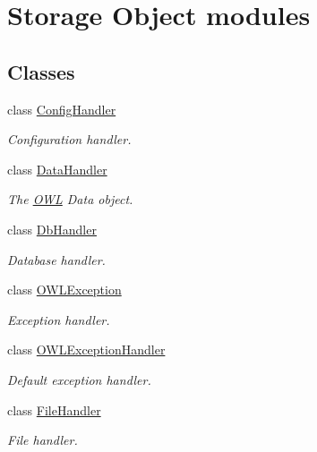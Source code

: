 \hypertarget{group__OWL__SO__LAYER}{
\section{Storage Object modules}
\label{group__OWL__SO__LAYER}
}
\subsection*{Classes}
\begin{CompactItemize}
\item 
class \hyperlink{classConfigHandler}{ConfigHandler}
\begin{CompactList}\small\item\em Configuration handler. \item\end{CompactList}\item 
class \hyperlink{classDataHandler}{DataHandler}
\begin{CompactList}\small\item\em The \hyperlink{classOWL}{OWL} Data object. \item\end{CompactList}\item 
class \hyperlink{classDbHandler}{DbHandler}
\begin{CompactList}\small\item\em Database handler. \item\end{CompactList}\item 
class \hyperlink{classOWLException}{OWLException}
\begin{CompactList}\small\item\em Exception handler. \item\end{CompactList}\item 
class \hyperlink{classOWLExceptionHandler}{OWLExceptionHandler}
\begin{CompactList}\small\item\em Default exception handler. \item\end{CompactList}\item 
class \hyperlink{classFileHandler}{FileHandler}
\begin{CompactList}\small\item\em File handler. \item\end{CompactList}\item 

\end{CompactItemize}
